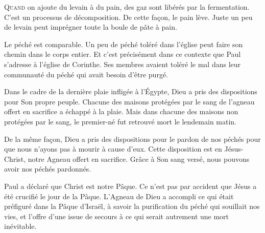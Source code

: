 
\lettrine{Q}{uand} on ajoute du levain à du pain,
 des gaz sont libérés par la fermentation.
 C'est un processus de décomposition.
 De cette fa\c{c}on, le pain lève.
 Juste un peu de levain peut imprégner
 toute la boule de pâte à pain.

Le péché est comparable.
 Un peu de péché toléré dans l'église
 peut faire son chemin dans le corps entier.
 Et c'est précisément dans ce contexte que Paul
 s'adresse à l'église de Corinthe.
 Ses membres avaient toléré le mal
 dans leur communauté
 \ocadr du péché qui avait besoin d'être purgé.


Dans le cadre de la dernière plaie infligée à l'Égypte,
 Dieu a pris des dispositions pour Son propre peuple.
 Chacune des maisons protégées par le sang de l'agneau
 offert en sacrifice a échappé à la plaie.
 Mais dans chacune des maisons non protégées par le sang,
 le premier-né fut retrouvé mort le lendemain matin.

De la même fa\c{c}on, Dieu a pris des dispositions
 pour le pardon de nos péchés pour que nous n'ayons pas
 à mourir à cause d'eux.
 Cette disposition est en Jésus-Christ,
 notre Agneau offert en sacrifice.
 Grâce à Son sang versé,
 nous pouvons avoir nos péchés pardonnés.

Paul a déclaré que \Og Christ est notre Pâque. \Fg{}
 Ce n'est pas par accident que Jésus a été crucifié le jour de la Pâque.
 L'Agneau de Dieu a accompli ce qui était préfiguré
 dans la Pâque d'Israël, à savoir la purification du péché
 qui souillait nos vies, et l'offre d'une issue de secours
 à ce qui serait autrement une mort inévitable.

\dvrule







